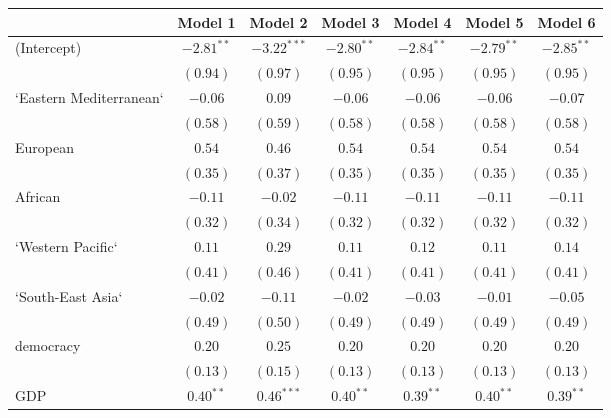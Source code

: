 
\begin{table}[!h]
\begin{center}
\begin{tabular}{l c c c c c c }
\toprule
 & Model 1 & Model 2 & Model 3 & Model 4 & Model 5 & Model 6 \\
\midrule
(Intercept)             & $-2.81^{**}$ & $-3.22^{***}$ & $-2.80^{**}$ & $-2.84^{**}$ & $-2.79^{**}$ & $-2.85^{**}$ \\
                        & $(0.94)$     & $(0.97)$      & $(0.95)$     & $(0.95)$     & $(0.95)$     & $(0.95)$     \\
`Eastern Mediterranean` & $-0.06$      & $0.09$        & $-0.06$      & $-0.06$      & $-0.06$      & $-0.07$      \\
                        & $(0.58)$     & $(0.59)$      & $(0.58)$     & $(0.58)$     & $(0.58)$     & $(0.58)$     \\
European                & $0.54$       & $0.46$        & $0.54$       & $0.54$       & $0.54$       & $0.54$       \\
                        & $(0.35)$     & $(0.37)$      & $(0.35)$     & $(0.35)$     & $(0.35)$     & $(0.35)$     \\
African                 & $-0.11$      & $-0.02$       & $-0.11$      & $-0.11$      & $-0.11$      & $-0.11$      \\
                        & $(0.32)$     & $(0.34)$      & $(0.32)$     & $(0.32)$     & $(0.32)$     & $(0.32)$     \\
`Western Pacific`       & $0.11$       & $0.29$        & $0.11$       & $0.12$       & $0.11$       & $0.14$       \\
                        & $(0.41)$     & $(0.46)$      & $(0.41)$     & $(0.41)$     & $(0.41)$     & $(0.41)$     \\
`South-East Asia`       & $-0.02$      & $-0.11$       & $-0.02$      & $-0.03$      & $-0.01$      & $-0.05$      \\
                        & $(0.49)$     & $(0.50)$      & $(0.49)$     & $(0.49)$     & $(0.49)$     & $(0.49)$     \\
democracy               & $0.20$       & $0.25$        & $0.20$       & $0.20$       & $0.20$       & $0.20$       \\
                        & $(0.13)$     & $(0.15)$      & $(0.13)$     & $(0.13)$     & $(0.13)$     & $(0.13)$     \\
GDP                     & $0.40^{**}$  & $0.46^{***}$  & $0.40^{**}$  & $0.39^{**}$  & $0.40^{**}$  & $0.39^{**}$  \\

\end{tabular}
\end{center}
\end{table}
